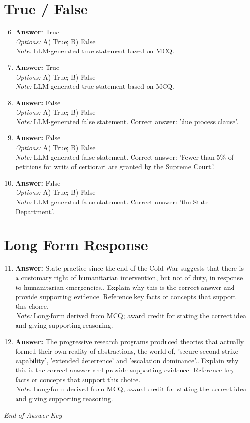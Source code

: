 \documentclass[12pt]{article}
\begin{document}
\section*{True / False}
\begin{enumerate}[label=\arabic*.]
\setcounter{enumi}{5}
\item \textbf{Answer:} True
\\ \textit{Options:} A) True; B) False
\\ \textit{Note:} LLM-generated true statement based on MCQ.
\item \textbf{Answer:} True
\\ \textit{Options:} A) True; B) False
\\ \textit{Note:} LLM-generated true statement based on MCQ.
\item \textbf{Answer:} False
\\ \textit{Options:} A) True; B) False
\\ \textit{Note:} LLM-generated false statement. Correct answer: 'due process clause'.
\item \textbf{Answer:} False
\\ \textit{Options:} A) True; B) False
\\ \textit{Note:} LLM-generated false statement. Correct answer: 'Fewer than 5\% of petitions for writs of certiorari are granted by the Supreme Court.'.
\item \textbf{Answer:} False
\\ \textit{Options:} A) True; B) False
\\ \textit{Note:} LLM-generated false statement. Correct answer: 'the State Department.'.
\end{enumerate}

\section*{Long Form Response}
\begin{enumerate}[label=\arabic*.]
\setcounter{enumi}{10}
\item \textbf{Answer:} State practice since the end of the Cold War suggests that there is a customary right of humanitarian intervention, but not of duty, in response to humanitarian emergencies.. Explain why this is the correct answer and provide supporting evidence. Reference key facts or concepts that support this choice.
\\ \textit{Note:} Long-form derived from MCQ; award credit for stating the correct idea and giving supporting reasoning.
\item \textbf{Answer:} The progressive research programs produced theories that actually formed their own reality of abstractions, the world of, 'secure second strike capability', 'extended deterrence' and 'escalation dominance'.. Explain why this is the correct answer and provide supporting evidence. Reference key facts or concepts that support this choice.
\\ \textit{Note:} Long-form derived from MCQ; award credit for stating the correct idea and giving supporting reasoning.
\end{enumerate}

\vfill
\noindent\textit{End of Answer Key}
\end{document}
